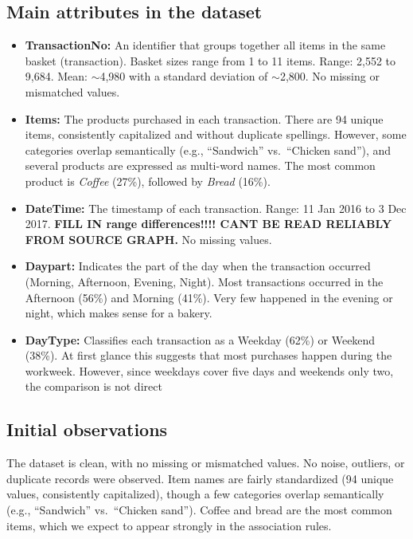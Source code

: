 \subsection*{Main attributes in the dataset}
\begin{itemize}
    \item \textbf{TransactionNo:} An identifier that groups together all items in the same basket (transaction).  
    Basket sizes range from 1 to 11 items.  
    Range: 2,552 to 9,684.  
    Mean: $\sim$4,980 with a standard deviation of $\sim$2,800.  
    No missing or mismatched values.  

    \item \textbf{Items:} The products purchased in each transaction.  
There are 94 unique items, consistently capitalized and without duplicate spellings.  
However, some categories overlap semantically (e.g., ``Sandwich'' vs.\ ``Chicken sand''), 
and several products are expressed as multi-word names.  
The most common product is \textit{Coffee} (27\%), followed by \textit{Bread} (16\%).  

    \item \textbf{DateTime:} The timestamp of each transaction.  
    Range: 11 Jan 2016 to 3 Dec 2017.  
    \textbf{FILL IN range differences!!!! CANT BE READ RELIABLY FROM SOURCE GRAPH.}
    No missing values.  

    \item \textbf{Daypart:} Indicates the part of the day when the transaction occurred (Morning, Afternoon, Evening, Night).  
    Most transactions occurred in the Afternoon (56\%) and Morning (41\%).  
    Very few happened in the evening or night, which makes sense for a bakery.  

    \item \textbf{DayType:} Classifies each transaction as a Weekday (62\%) or Weekend (38\%).  
    At first glance this suggests that most purchases happen during the workweek. 
    However, since weekdays cover five days and weekends only two, the comparison is not direct

\end{itemize}

\subsection*{Initial observations}
The dataset is clean, with no missing or mismatched values.  
No noise, outliers, or duplicate records were observed.  
Item names are fairly standardized (94 unique values, consistently capitalized), 
though a few categories overlap semantically (e.g., ``Sandwich'' vs.\ ``Chicken sand'').  
Coffee and bread are the most common items, 
which we expect to appear strongly in the association rules.  

